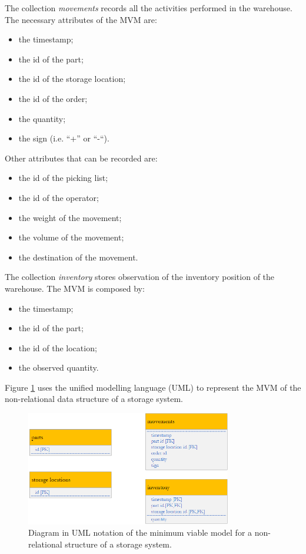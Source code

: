 The collection \textit{movements} records all the activities performed in the warehouse. The necessary attributes of the MVM are:
\begin{itemize}
    \item the timestamp;
    \item the id of the part; 
    \item the id of the storage location;
    \item the id of the order;
    \item the quantity;
    \item the sign (i.e. “+” or “-“). 
\end{itemize}

Other attributes that can be recorded are:
\begin{itemize}
    \item the id of the picking list; 
    \item the id of the operator; 
    \item the weight of the movement; 
    \item the volume of the movement; 
    \item the destination of the movement. 
\end{itemize}

The collection \textit{inventory} stores observation of the inventory position of the warehouse. The MVM is composed by:
\begin{itemize}
    \item the timestamp;
    \item the id of the part; 
    \item the id of the location;
    \item the observed quantity. 
\end{itemize}

Figure \ref{fig_MVM_wh} uses the unified modelling language (UML) to represent the MVM of the non-relational data structure of a storage system.

\begin{figure}[hbt!]
\centering
\includegraphics[width=0.8\textwidth]{SectionWarehouses/diagnsticModels_figures/fig_MVM.png}
\captionsetup{type=figure}
\caption{Diagram in UML notation of the minimum viable model for a non-relational structure of a storage system.}
\label{fig_MVM_wh}
\end{figure}


